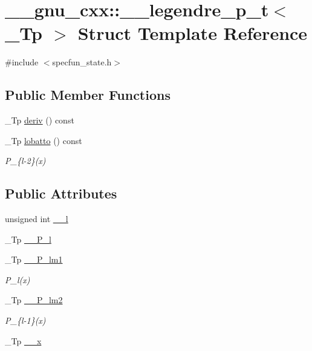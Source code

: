 \hypertarget{struct____gnu__cxx_1_1____legendre__p__t}{}\section{\+\_\+\+\_\+gnu\+\_\+cxx\+:\+:\+\_\+\+\_\+legendre\+\_\+p\+\_\+t$<$ \+\_\+\+Tp $>$ Struct Template Reference}
\label{struct____gnu__cxx_1_1____legendre__p__t}


{\ttfamily \#include $<$specfun\+\_\+state.\+h$>$}

\subsection*{Public Member Functions}
\begin{DoxyCompactItemize}
\item 
\+\_\+\+Tp \hyperlink{struct____gnu__cxx_1_1____legendre__p__t_a91e1b4e4049e5085b52342db2afbad9d}{deriv} () const
\item 
\+\_\+\+Tp \hyperlink{struct____gnu__cxx_1_1____legendre__p__t_a46721d510114bf2b37204916611c4134}{lobatto} () const
\begin{DoxyCompactList}\small\item\em P\+\_\+\{l-\/2\}(x) \end{DoxyCompactList}\end{DoxyCompactItemize}
\subsection*{Public Attributes}
\begin{DoxyCompactItemize}
\item 
unsigned int \hyperlink{struct____gnu__cxx_1_1____legendre__p__t_a77414fd857c52a303a3cd1a0f4085527}{\+\_\+\+\_\+l}
\item 
\+\_\+\+Tp \hyperlink{struct____gnu__cxx_1_1____legendre__p__t_a76c0a4fa069deeed203214f5e282d7d9}{\+\_\+\+\_\+\+P\+\_\+l}
\item 
\+\_\+\+Tp \hyperlink{struct____gnu__cxx_1_1____legendre__p__t_a8c8218ef16c4d7d980c94dba241b1682}{\+\_\+\+\_\+\+P\+\_\+lm1}
\begin{DoxyCompactList}\small\item\em P\+\_\+l(x) \end{DoxyCompactList}\item 
\+\_\+\+Tp \hyperlink{struct____gnu__cxx_1_1____legendre__p__t_a9090dfe57d4b5993828510fd0202c888}{\+\_\+\+\_\+\+P\+\_\+lm2}
\begin{DoxyCompactList}\small\item\em P\+\_\+\{l-\/1\}(x) \end{DoxyCompactList}\item 
\+\_\+\+Tp \hyperlink{struct____gnu__cxx_1_1____legendre__p__t_ab71bc6febb6c33ca7be6beb0f30edd83}{\+\_\+\+\_\+x}
\end{DoxyCompactItemize}


